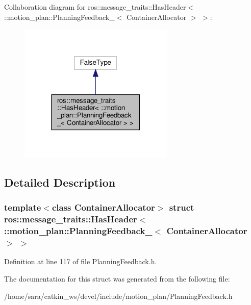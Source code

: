 Collaboration diagram for ros\+:\+:message\+\_\+traits\+:\+:Has\+Header$<$ \+:\+:motion\+\_\+plan\+:\+:Planning\+Feedback\+\_\+$<$ Container\+Allocator $>$ $>$\+:
\nopagebreak
\begin{figure}[H]
\begin{center}
\leavevmode
\includegraphics[width=209pt]{structros_1_1message__traits_1_1HasHeader_3_01_1_1motion__plan_1_1PlanningFeedback___3_01Contain70c21fcb54d64079415102f53b64aea8}
\end{center}
\end{figure}


\subsection{Detailed Description}
\subsubsection*{template$<$class Container\+Allocator$>$\newline
struct ros\+::message\+\_\+traits\+::\+Has\+Header$<$ \+::motion\+\_\+plan\+::\+Planning\+Feedback\+\_\+$<$ Container\+Allocator $>$ $>$}



Definition at line 117 of file Planning\+Feedback.\+h.



The documentation for this struct was generated from the following file\+:\begin{DoxyCompactItemize}
\item 
/home/sara/catkin\+\_\+ws/devel/include/motion\+\_\+plan/Planning\+Feedback.\+h\end{DoxyCompactItemize}
